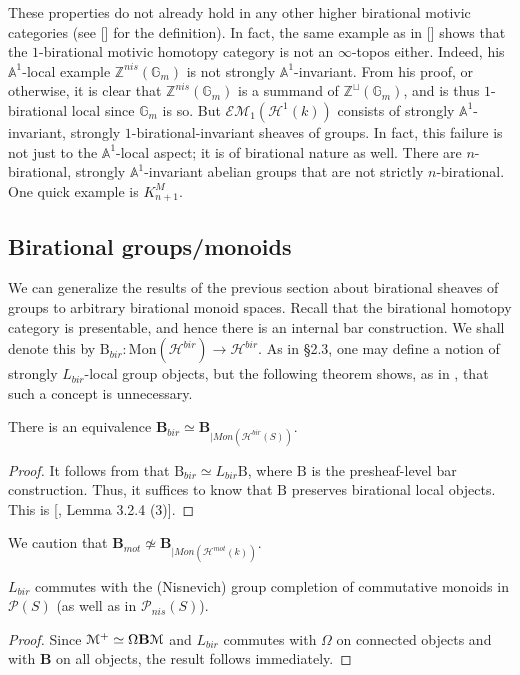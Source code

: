 \begin{rem}
 These properties do not already hold in any other higher birational motivic categories (see [\cite{sfbat}] for the definition). In fact, the same example as in [\cite{choudhury2014connectivity}] shows that the $1$-birational motivic homotopy category is not an $\infty$-topos either. Indeed, his $\mathbb{A}^1$-local example $\mathbb{Z}^{nis}(\mathbb{G}_m)$ is not strongly $\mathbb{A}^1$-invariant. From his proof, or otherwise, it is clear that $\mathbb{Z}^{nis}(\mathbb{G}_m)$ is a summand of $\mathbb{Z}^\sqcup (\mathbb{G}_m)$, and is thus $1$-birational local since $\mathbb{G}_m$ is so. But $\mathcal{EM}_1(\mathcal{H}^{1}(k))$ consists of strongly $\mathbb{A}^1$-invariant, strongly $1$-birational-invariant sheaves of groups. In fact, this failure is not just to the $\mathbb{A}^1$-local aspect; it is of birational nature as well. There are $n$-birational, strongly $\mathbb{A}^1$-invariant abelian groups that are not strictly $n$-birational. One quick example is $K_{n+1}^M$.
 \end{rem}

\subsection{Birational groups/monoids}
We can generalize the results of the previous section about birational sheaves of groups to arbitrary birational monoid spaces. Recall that the birational homotopy category is presentable, and hence there is an internal bar construction. We shall denote this by $\mathrm{B}_{bir}: \mathrm{Mon}(\mathcal{H}^{bir})\to \mathcal{H}^{bir}$. As in \S2.3, one may define a notion of strongly $L_{bir}$-local group objects, but the following theorem shows, as in , that such a concept is unnecessary.
\begin{thm}\label{B_bir is B}
    There is an equivalence $\mathbf{B}_{bir}\simeq \mathbf{B}_{|Mon(\mathcal{H}^{bir}(S))}$.
\end{thm}
\begin{proof}
It follows from  that $\mathrm{B}_{bir}\simeq L_{bir} \mathrm{B}$, where $\mathrm{B}$ is the presheaf-level bar construction. Thus, it suffices to know that $\mathrm{B}$ preserves birational local objects. This is [\cite{0bat}, Lemma 3.2.4 (3)].
\end{proof}
We caution that $\mathbf{B}_{mot}\not\simeq \mathbf{B}_{|Mon(\mathcal{H}^{mot}(k))}$.
\begin{thm}\label{bir commute group competition}
        $L_{bir}$ commutes with the (Nisnevich) group completion of commutative monoids in $\mathcal{P}(S)$ (as well as in $\mathcal{P}_{nis}(S)$).
\end{thm}
\begin{proof}
 Since $\EuScript{M}^+\simeq \Omega\mathbf{B} \EuScript{M}$ and $L_{bir} $ commutes with $\Omega $ on connected objects and with $\mathbf{B}$ on all objects, the result follows immediately.
\end{proof}

